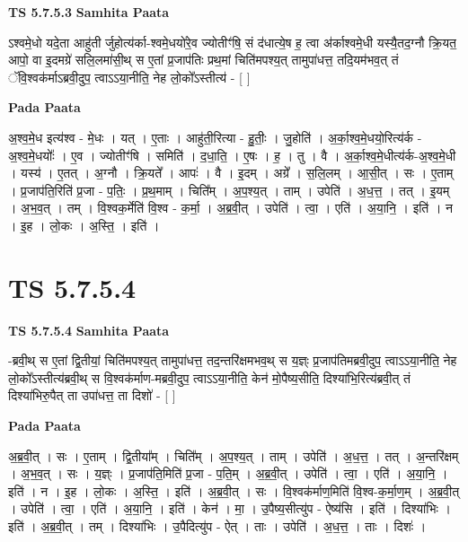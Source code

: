 \documentclass[17pt]{extarticle}
\begin{document}
\textbf{TS 5.7.5.3 } \newline
\textbf{Samhita Paata} \newline

ऽश्वमे॒धो यदे॒ता आहु॑ती र्जुहोत्य॑र्का-श्वमे॒धयो॑रे॒व ज्योतीꣳ॑षि॒ सं द॑धात्ये॒ष ह॒ त्वा अ॑र्काश्वमे॒धी यस्यै॒तद॒ग्नौ क्रि॒यत॒ आपो॒ वा इ॒दमग्रे॑ सलि॒लमा॑सी॒थ् स ए॒तां प्र॒जाप॑तिः प्रथ॒मां चिति॑मपश्य॒त् तामुपा॑धत्त॒ तदि॒यम॑भव॒त् तं ॅवि॒श्वक॑र्माऽब्रवी॒दुप॒ त्वाऽऽया॒नीति॒ नेह लो॒को᳚ऽस्तीत्य॑ - [  ] \newline

\textbf{Pada Paata} \newline

अ॒श्व॒मे॒ध इत्य॑श्व - मे॒धः । यत् । ए॒ताः । आहु॑ती॒रित्या - हु॒तीः॒ । जु॒होति॑ । अ॒र्का॒श्व॒मे॒धयो॒रित्य॑र्क - अ॒श्व॒मे॒धयोः᳚ । ए॒व । ज्योतीꣳ॑षि । समिति॑ । द॒धा॒ति॒ । ए॒षः । ह॒ । तु । वै । अ॒र्का॒श्व॒मे॒धीत्य॑र्क-अ॒श्व॒मे॒धी । यस्य॑ । ए॒तत् । अ॒ग्नौ । क्रि॒यते᳚ । आपः॑ । वै । इ॒दम् । अग्रे᳚ । स॒लि॒लम् । आ॒सी॒त् । सः । ए॒ताम् । प्र॒जाप॑ति॒रिति॑ प्र॒जा - प॒तिः॒ । प्र॒थ॒माम् । चिति᳚म् । अ॒प॒श्य॒त् । ताम् । उपेति॑ । अ॒ध॒त्त॒ । तत् । इ॒यम् । अ॒भ॒व॒त् । तम् । वि॒श्वक॒र्मेति॑ वि॒श्व - क॒र्मा॒ । अ॒ब्र॒वी॒त् । उपेति॑ । त्वा॒ । एति॑ । अ॒या॒नि॒ । इति॑ । न । इ॒ह । लो॒कः । अ॒स्ति॒ । इति॑ ।  \newline





\section{ TS 5.7.5.4 }

\textbf{TS 5.7.5.4 } \newline
\textbf{Samhita Paata} \newline

-ब्रवी॒थ् स ए॒तां द्वि॒तीयां॒ चिति॑मपश्य॒त् तामुपा॑धत्त॒ तद॒न्तरि॑क्षमभव॒थ् स य॒ज्ञ्ः प्र॒जाप॑तिमब्रवी॒दुप॒ त्वाऽऽया॒नीति॒ नेह लो॒को᳚ऽस्तीत्य॑ब्रवी॒थ् स वि॒श्वक॑र्माण-मब्रवी॒दुप॒ त्वाऽऽया॒नीति॒ केन॑ मो॒पैष्य॒सीति॒ दिश्या॑भि॒रित्य॑ब्रवी॒त् तं दिश्या॑भिरु॒पैत् ता उपा॑धत्त॒ ता दिशो॑ - [  ] \newline

\textbf{Pada Paata} \newline

अ॒ब्र॒वी॒त् । सः । ए॒ताम् । द्वि॒तीया᳚म् । चिति᳚म् । अ॒प॒श्य॒त् । ताम् । उपेति॑ । अ॒ध॒त्त॒ । तत् । अ॒न्तरि॑क्षम् । अ॒भ॒व॒त् । सः । य॒ज्ञ्ः । प्र॒जाप॑ति॒मिति॑ प्र॒जा - प॒ति॒म् । अ॒ब्र॒वी॒त् । उपेति॑ । त्वा॒ । एति॑ । अ॒या॒नि॒ । इति॑ । न । इ॒ह । लो॒कः । अ॒स्ति॒ । इति॑ । अ॒ब्र॒वी॒त् । सः । वि॒श्वक॑र्माण॒मिति॑ वि॒श्व-क॒र्मा॒ण॒म् । अ॒ब्र॒वी॒त् । उपेति॑ । त्वा॒ । एति॑ । अ॒या॒नि॒ । इति॑ । केन॑ । मा॒ । उ॒पैष्य॒सीत्यु॑प - ऐष्य॑सि । इति॑ । दिश्या॑भिः । इति॑ । अ॒ब्र॒वी॒त् । तम् । दिश्या॑भिः । उ॒पैदित्यु॑प - ऐत् । ताः । उपेति॑ । अ॒ध॒त्त॒ । ताः । दिशः॑ ।  \newline
\end{document}
